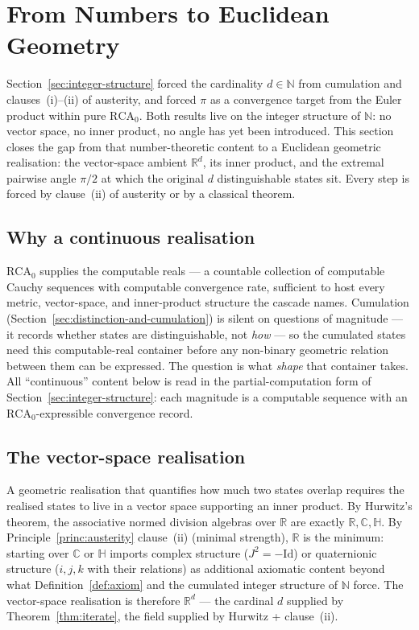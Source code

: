 \documentclass[11pt,a4paper]{article}
\begin{document}
\section{From Numbers to Euclidean Geometry}\label{sec:numbers-to-geometry}

Section~\ref{sec:integer-structure} forced the cardinality
$d\in\mathbb{N}$ from cumulation and clauses~(i)--(ii) of austerity,
and forced $\pi$ as a convergence target from the Euler product
within pure $\mathrm{RCA}_0$. Both results live on the integer
structure of $\mathbb{N}$: no vector space, no inner product, no
angle has yet been introduced. This section closes the gap from
that number-theoretic content to a Euclidean geometric realisation:
the vector-space ambient $\mathbb{R}^d$, its inner product, and the
extremal pairwise angle $\pi/2$ at which the original $d$
distinguishable states sit. Every step is forced by clause~(ii) of
austerity or by a classical theorem.

\subsection*{Why a continuous realisation}

$\mathrm{RCA}_0$ supplies the computable reals --- a countable
collection of computable Cauchy sequences with computable
convergence rate, sufficient to host every metric, vector-space, and
inner-product structure the cascade names. Cumulation
(Section~\ref{sec:distinction-and-cumulation}) is silent on
questions of magnitude --- it records whether states are
distinguishable, not \emph{how} --- so the cumulated states need
this computable-real container before any non-binary geometric
relation between them can be expressed. The question is what
\emph{shape} that container takes. All ``continuous'' content below
is read in the partial-computation form of
Section~\ref{sec:integer-structure}: each magnitude is a computable
sequence with an $\mathrm{RCA}_0$-expressible convergence record.

\subsection*{The vector-space realisation}

A geometric realisation that quantifies how much two states overlap
requires the realised states to live in a vector space supporting an
inner product. By Hurwitz's theorem, the associative normed division
algebras over $\mathbb{R}$ are exactly $\mathbb{R}, \mathbb{C},
\mathbb{H}$. By Principle~\ref{princ:austerity} clause~(ii)
(minimal strength), $\mathbb{R}$ is the minimum: starting over
$\mathbb{C}$ or $\mathbb{H}$ imports complex structure ($J^2 =
-\mathrm{Id}$) or quaternionic structure ($i, j, k$ with their
relations) as additional axiomatic content beyond what
Definition~\ref{def:axiom} and the cumulated integer structure of
$\mathbb{N}$ force. The vector-space realisation is therefore
$\mathbb{R}^d$ --- the cardinal $d$ supplied by
Theorem~\ref{thm:iterate}, the field supplied by Hurwitz +
clause~(ii).
\end{document}
